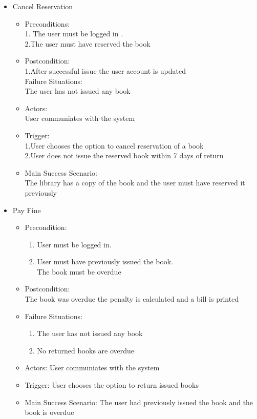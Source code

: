 \documentclass[a4paper]{article}
\begin{document}
\begin{enumerate}
\begin{itemize}
 \item Cancel Reservation\\
 \begin{itemize}
 \item  Preconditions:\\
 1. The user must be logged in .\\
 2.The user must have reserved the book\\
 \item Postcondition:\\
 1.After successful issue the user account is updated \\
Failure Situations:\\The user has not issued any book\\
 \item Actors: \\User communiates with the system\\
 \item Trigger:\\ 
 1.User chooses the option to cancel reservation of a book \\
 2.User does not issue the reserved book within 7 days of return\\
 \item Main Success Scenario:\\ The library has a copy of the book and the user must have reserved it previously\\
	
 \end{itemize}

\item Pay Fine\\
	\begin{itemize}
	\item  Precondition:\\
	\begin{enumerate}	
	\item User must be logged in.\\
	\item User must have previously issued the book.\\The book must be overdue\\
	\end{enumerate}
 \item Postcondition:\\
  The book was overdue the penalty is calculated and a bill is printed 
 \item Failure Situations:
 \begin{enumerate}
 \item The user has not issued any book
  \item No returned books are overdue
	\end{enumerate} 
 \item Actors: User communiates with the system
 \item Trigger: User chooses the option to return issued books
 \item Main Success Scenario: The user had previously issued the book and the book is overdue
	\end{itemize}
\end{itemize}



\end{enumerate}
\end{document}
